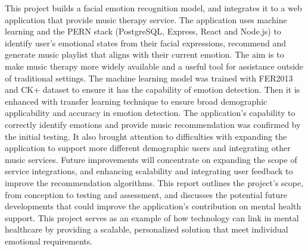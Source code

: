 This project builds a facial emotion recognition model, and integrates it to a web application that provide music therapy service.
The application uses machine learning and the PERN stack (PostgreSQL, Express, React and Node.js) to identify user's emotional states from their facial expressions, recommend and generate music playlist that aligns with their current emotion.
The aim is to make music therapy more widely available and a useful tool for assistance outside of traditional settings. 
The machine learning model was trained with FER2013 and CK+ dataset to ensure it has the capability of emotion detection.
Then it is enhanced with transfer learning technique to ensure broad demographic applicability and accuracy in emotion detection.
The application's capability to correctly identify emotions and provide music recommendation was confirmed by the initial testing.
It also brought attention to difficulties with expanding the application to support more different demographic users and integrating other music services.
Future improvements will concentrate on expanding the scope of service integrations, and enhancing scalability and integrating user feedback to improve the recommendation algorithms.
This report outlines the project's scope, from conception to testing and assessment, and discusses the potential future developments that could improve the application's contribution on mental health support. 
This project serves as an example of how technology can link in mental healthcare by providing a scalable, personalized solution that meet individual emotional requirements.